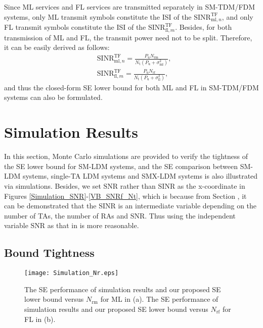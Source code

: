 \documentclass[journal]{IEEEtran}
\begin{document}
Since ML services and FL services are transmitted separately in SM-TDM/FDM systems, only ML transmit symbols constitute the ISI of the $\text{SINR}^\text{TF}_{\text{ml},n}$, and only FL transmit symbols constitute the ISI of the $\text{SINR}^\text{TF}_{\text{fl},m}$. Besides, for both transmission of ML and FL, the transmit power need not to be split. Therefore, it can be easily derived as follows:
\begin{equation}
\begin{split}
&\text{SINR}^\text{TF}_{\text{ml},n} = \frac{P_\text{u}N_\text{rm}} { N_\text{t}(P_\text{u} + \sigma_\text{ml}^2)}, \\
&\text{SINR}^\text{TF}_{\text{fl},m} = \frac{P_\text{u}N_\text{rf}} { N_\text{t}(P_\text{u} + \sigma_\text{fl}^2)},
\label{SINR_TF}
\end{split}
\end{equation}
and thus the closed-form SE lower bound for both ML and FL in SM-TDM/FDM systems can also be formulated.


\section{Simulation Results}
In this section, Monte Carlo simulations are provided to verify the tightness of the SE lower bound for SM-LDM systems, and the SE comparison between SM-LDM systems, single-TA LDM systems and SMX-LDM systems is also illustrated via simulations. Besides, we set $\text{SNR}$ rather than $\text{SINR}$ as the x-coordinate in Figures \ref{Simulation_SNR}-\ref{VB_SNRf_Nt}, which is because from Section \uppercase\expandafter{}, it can be demonstrated that the $\text{SINR}$ is an intermediate variable depending on the number of TAs, the number of RAs and $\text{SNR}$. Thus using the independent variable $\text{SNR}$ as that in \cite{Massive_SINR} is more reasonable.


\subsection{Bound Tightness}
\begin{figure}
  \centering
  \texttt{[image: Simulation\_Nr.eps]}
  \caption{The SE performance of simulation results and our proposed SE lower bound versus $N_\text{rm}$ for ML in (a). The SE performance of simulation results and our proposed SE lower bound versus $N_\text{rf}$ for FL in (b).}\label{Simulation_Nr}
\end{figure}
\end{document}
